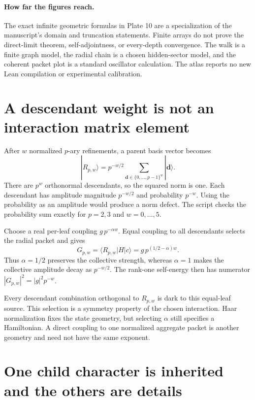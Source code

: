 \paragraph{How far the figures reach.}
The exact infinite geometric formulas in Plate 10 are a specialization of the manuscript's domain and truncation statements. Finite arrays do not prove the direct-limit theorem, self-adjointness, or every-depth convergence. The walk is a finite graph model, the radial chain is a chosen hidden-sector model, and the coherent packet plot is a standard oscillator calculation. The atlas reports no new Lean compilation or experimental calibration.

\clearpage
\section{A descendant weight is not an interaction matrix element}

After $w$ normalized $p$-ary refinements, a parent basis vector becomes
\[
|R_{p,w}\rangle=p^{-w/2}\sum_{\mathbf d\in\{0,\ldots,p-1\}^w}|\mathbf d\rangle.
\]
There are $p^w$ orthonormal descendants, so the squared norm is one. Each descendant has amplitude magnitude $p^{-w/2}$ and probability $p^{-w}$. Using the probability as an amplitude would produce a norm defect. The script checks the probability sum exactly for $p=2,3$ and $w=0,\ldots,5$.

Choose a real per-leaf coupling $g\,p^{-\alpha w}$. Equal coupling to all descendants selects the radial packet and gives
\[
G_{p,w}=\langle R_{p,w}|H|c\rangle
=g\,p^{(1/2-\alpha)w}.
\]
Thus $\alpha=1/2$ preserves the collective strength, whereas $\alpha=1$ makes the collective amplitude decay as $p^{-w/2}$. The rank-one self-energy then has numerator $|G_{p,w}|^2=|g|^2p^{-w}$.

Every descendant combination orthogonal to $R_{p,w}$ is dark to this equal-leaf source. This selection is a symmetry property of the chosen interaction. Haar normalization fixes the state geometry, but selecting $\alpha$ still specifies a Hamiltonian. A direct coupling to one normalized aggregate packet is another geometry and need not have the same exponent.



\clearpage
\section{One child character is inherited and the others are details}


